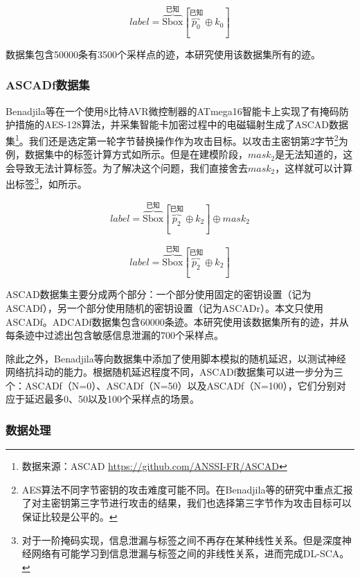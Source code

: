 {	\begin{equation}\label{eq:aesrdmodel}
		label=\overbrace{\mathrm{Sbox}}^{\mbox{已知}}[\overbrace{p_0}^{\mbox{已知}}\oplus k_0]
	\end{equation}
	
	数据集包含50000条有3500个采样点的迹，本研究使用该数据集所有的迹。
	\subsubsection{ASCADf数据集}
	Benadjila等\citep{Benadjila20}在一个使用8比特AVR微控制器的ATmega16智能卡上实现了有掩码防护措施的AES-128算法，并采集智能卡加密过程中的电磁辐射生成了ASCAD数据集\footnote{数据来源：ASCAD \href{https://github.com/ANSSI-FR/ASCAD}{https://github.com/ANSSI-FR/ASCAD}}。我们还是选定第一轮字节替换操作作为攻击目标。以攻击主密钥第2字节\footnote{AES算法不同字节密钥的攻击难度可能不同。在Benadjila等的研究中重点汇报了对主密钥第三字节进行攻击的结果，我们也选择第三字节作为攻击目标可以保证比较是公平的。}为例，数据集中的标签计算方式如所示。但是在建模阶段，$mask_2$是无法知道的，这会导致无法计算标签。为了解决这个问题，我们直接舍去$mask_2$，这样就可以计算出标签\footnote{对于一阶掩码实现，信息泄漏与标签之间不再存在某种线性关系。但是深度神经网络有可能学习到信息泄漏与标签之间的非线性关系，进而完成DL-SCA。}，如所示。
	
	\begin{equation}\label{eq:ascadbadmodel}
		label=\overbrace{\mathrm{Sbox}}^{\mbox{已知}}[\overbrace{p_2}^{\mbox{已知}}\oplus k_2]\oplus mask_2
	\end{equation}
	
	\begin{equation}\label{eq:ascadmodel}
		label=\overbrace{\mathrm{Sbox}}^{\mbox{已知}}[\overbrace{p_2}^{\mbox{已知}}\oplus k_2]
	\end{equation}
	
	ASCAD数据集主要分成两个部分：一个部分使用固定的密钥设置（记为ASCADf），另一个部分使用随机的密钥设置（记为ASCADr）。本文只使用ASCADf。ADCADf数据集包含60000条迹。本研究使用该数据集所有的迹，并从每条迹中过滤出包含敏感信息泄漏的700个采样点。
	
	除此之外，Benadjila等向数据集中添加了使用脚本模拟的随机延迟，以测试神经网络抗抖动的能力。根据随机延迟程度不同，ASCADf数据集可以进一步分为三个：ASCADf（N=0）、ASCADf（N=50）以及ASCADf（N=100），它们分别对应于延迟最多0、50以及100个采样点的场景。
	
	\subsubsection{数据处理}
	
}
